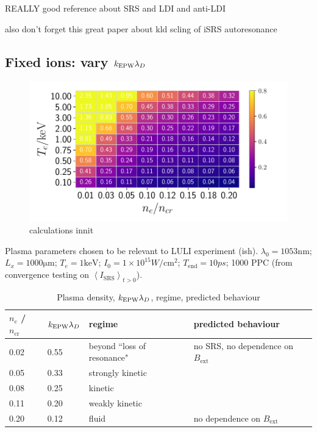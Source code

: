 \citep{Feng2018} REALLY good reference about SRS and LDI and anti-LDI

also don't forget this great paper about kld scling of iSRS autoresonance \citep{Chapman2013}

\subsection{Fixed ions: vary $k_\mathrm{EPW}\lambda_D$}

\begin{figure}[ht]
   \centering
    \includegraphics[width=\columnwidth]{Chapters/C6_magSRS/kld_scan_ben_simon.pdf}
    \caption{calculations innit}
    \label{fig:kld_scan}
\end{figure}{}


Plasma parameters chosen to be relevant to LULI experiment (ish). $\lambda_0 = 1053 \si{\nano\metre}$; $L_x = 1000 \si{\micro\metre}$; $T_e = 1 \si{\kilo\electronvolt}$; $I_0 = 1\times 10^{15}\si{W/\cm^2}$; $T_{\mathrm{end}}=10 \si{ps}$; 1000 PPC (from convergence testing on $\left< I_{\mathrm{SRS}} \right>_{t>0}$).

\begin{table}[h]
\begin{center}

\begin{tabular}{|l|l|l|l|}
\hline
$n_e$ / $n_{\mathrm{cr}}$ & $k_\mathrm{EPW}\lambda_D$ & regime & predicted behaviour\\ \hline \hline
0.02 & 0.55 & beyond ``loss of resonance" & no SRS, no dependence on $B_{\mathrm{ext}}$  \\ \hline
0.05 & 0.33 & strongly kinetic &  \\ \hline
0.08 & 0.25 & kinetic &  \\ \hline
0.11 & 0.20 & weakly kinetic & \\ \hline
0.20 & 0.12 & fluid & no dependence on $B_{\mathrm{ext}}$\\ \hline

\end{tabular}

\end{center}
\caption{Plasma density, $k_\mathrm{EPW}\lambda_D$, regime, predicted behaviour}
\label{tab:predictions}
\end{table}

